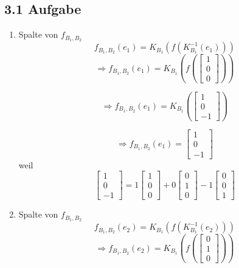 \documentclass{report}
\begin{document}
\subsection*{3.1 Aufgabe}
\begin{enumerate}
    \item Spalte von $f_{B_1,B_2}$
        $$f_{B_1,B_2}(e_1) = K_{B_1}(f(K_{B_1}^{-1}(e_1))) $$
        $$\Rightarrow f_{B_1,B_2}(e_1) = K_{B_1}(f(\begin{bmatrix}
            1 \\
            0 \\ 
            0
        \end{bmatrix})) $$
        
        $$\Rightarrow f_{B_1,B_2}(e_1) = K_{B_1}(\begin{bmatrix}
            1 \\
            0 \\ 
            -1
        \end{bmatrix}) $$

        $$\Rightarrow f_{B_1,B_2}(e_1) = \begin{bmatrix}
            1 \\
            0 \\ 
            -1
        \end{bmatrix} $$
        weil 
        \[
           \begin{bmatrix}
           1 \\
           0 \\
           -1
           \end{bmatrix} = 1 
           \begin{bmatrix}
              1 \\
              0 \\
              0
           \end{bmatrix}   + 0 
           \begin{bmatrix}
              0 \\
              1 \\
              0
           \end{bmatrix}   -1  
           \begin{bmatrix}
              0 \\
              0 \\
              1
           \end{bmatrix}    
        \] 

    \item Spalte von $f_{B_1,B_2}$
        $$f_{B_1,B_2}(e_2) = K_{B_1}(f(K_{B_1}^{-1}(e_2))) $$
        $$\Rightarrow f_{B_1,B_2}(e_2) = K_{B_1}(f(\begin{bmatrix}
            0 \\
            1 \\ 
            0
        \end{bmatrix})) $$


\end{enumerate}
\end{document}
